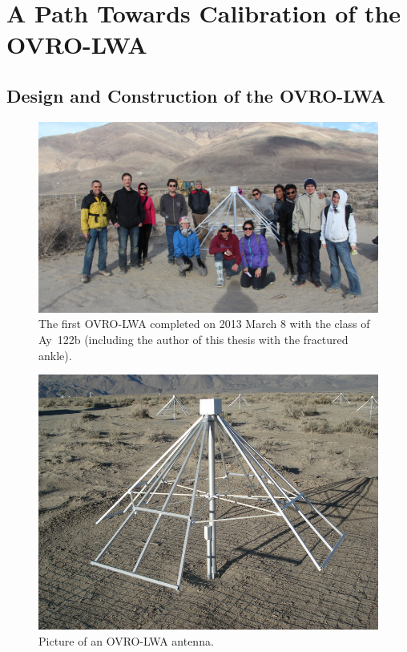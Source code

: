 \chapter{A Path Towards Calibration of the OVRO-LWA}
\label{chapter2}

\begin{bibunit}

\section{Design and Construction of the OVRO-LWA}

\begin{figure}
    \centering
    \includegraphics[width=\textwidth]{figures/chapter2/first-antenna}
    \caption{
        The first OVRO-LWA completed on 2013 March 8 with the class of Ay~122b (including the author
        of this thesis with the fractured ankle).
    }
    \label{fig:ovro-first-antenna}
\end{figure}

\begin{figure}
    \centering
    \includegraphics[width=\textwidth]{figures/chapter2/lwa-antenna}
    \caption{
        Picture of an OVRO-LWA antenna.
    }
    \label{fig:ovro-lwa-pictures}
\end{figure}


\end{bibunit}
